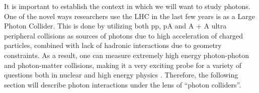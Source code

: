 It is important to establish the context in which we will want to study photons. One of the novel ways researchers use the LHC in the last few years is as a Large Photon Collider. This is done by utilizing both pp, pA and A + A ultra peripheral collisions as sources of photons due to high acceleration of charged particles, combined with lack of hadronic interactions due to geometry constraints. As a result, one can measure extremely high energy photon-photon and photon-matter collisions, making it a very exciting probe for a variety of questions both in nuclear and high energy physics \cite{strikman_probing_2006,iancu_probing_2023,mantysaari_probing_2023}. Therefore, the following section will describe photon interactions under the lens of ``photon colliders''. 